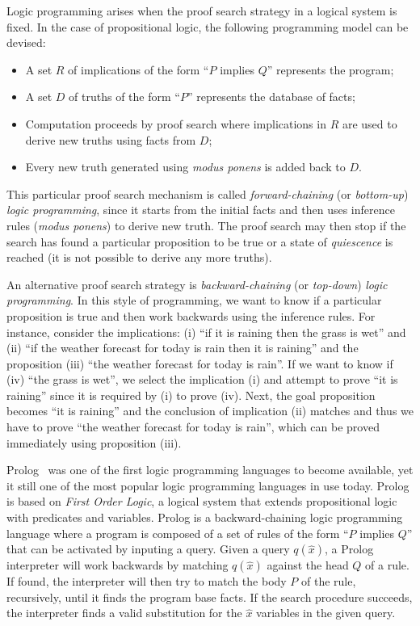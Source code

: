 Logic programming arises when the proof search strategy in a logical system is
fixed. In the case of propositional logic, the following programming model can
be devised:

\begin{itemize}
   \item A set $R$ of implications of the form ``$P$ implies $Q$'' represents the
      program;
   \item A set $D$ of truths of the form ``$P$'' represents the database of
      facts;
   \item Computation proceeds by proof search where implications in $R$ are used
      to derive new truths using facts from $D$;
   \item Every new truth generated using \emph{modus ponens} is added back to
      $D$.
\end{itemize}

This particular proof search mechanism is called \emph{forward-chaining} (or
\emph{bottom-up}) \emph{logic programming}, since it starts from the initial
facts and then uses inference rules (\emph{modus ponens}) to derive new truth.
The proof search may then stop if the search has found a particular proposition
to be true or a state of \emph{quiescence} is reached (it is not possible to
derive any more truths).

An alternative proof search strategy is \emph{backward-chaining} (or
\emph{top-down}) \emph{logic programming}. In this style of programming, we want
to know if a particular proposition is true and then work backwards using the
inference rules. For instance, consider the implications: (i) ``if it is raining
then the grass is wet'' and (ii) ``if the weather forecast for today is rain then
it is raining'' and the proposition (iii) ``the weather forecast for today is
rain''. If we want to know if (iv) ``the grass is wet'', we select the
implication (i) and attempt to prove ``it is raining'' since it is required by
(i) to prove (iv). Next, the goal proposition becomes ``it
is raining'' and the conclusion of implication (ii) matches and thus we have to
prove ``the weather forecast for today is rain'', which can be proved
immediately using proposition (iii).

Prolog~\cite{Colmerauer:1993:BP:154766.155362} was one of the first logic
programming languages to become available, yet it still one of the most popular
logic programming languages in use today. Prolog is based on \emph{First Order
Logic}, a logical system that extends propositional logic with predicates and
variables. Prolog is a backward-chaining logic programming language where a
program is composed of a set of rules of the form ``$P$ implies $Q$'' that can be
activated by inputing a query.  Given a query $q(\hat{x})$, a Prolog interpreter
will work backwards by matching $q(\hat{x})$ against the head $Q$ of a rule. If
found, the interpreter will then try to match the body $P$ of the rule,
recursively, until it finds the program base facts. If the search procedure
succeeds, the interpreter finds a valid substitution for the $\hat{x}$ variables
in the given query.

